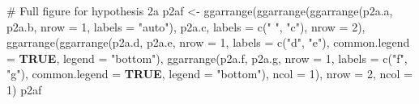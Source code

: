\documentclass[
  bookmarksnumbered]{article}
\newenvironment{Shaded}{\begin{snugshade}}{\end{snugshade}}
\newcommand{\AttributeTok}[1]{\textcolor[rgb]{0.80,0.80,0.80}{#1}}
\newcommand{\CommentTok}[1]{\textcolor[rgb]{0.50,0.62,0.50}{#1}}
\newcommand{\ConstantTok}[1]{\textcolor[rgb]{0.86,0.64,0.64}{\textbf{#1}}}
\newcommand{\DecValTok}[1]{\textcolor[rgb]{0.86,0.86,0.80}{#1}}
\newcommand{\FunctionTok}[1]{\textcolor[rgb]{0.94,0.94,0.56}{#1}}
\newcommand{\NormalTok}[1]{\textcolor[rgb]{0.80,0.80,0.80}{#1}}
\newcommand{\OtherTok}[1]{\textcolor[rgb]{0.94,0.94,0.56}{#1}}
\newcommand{\StringTok}[1]{\textcolor[rgb]{0.80,0.58,0.58}{#1}}
\begin{document}
\begin{Shaded}
\begin{Highlighting}[]
\CommentTok{\# Full figure for hypothesis 2a}
\NormalTok{p2af }\OtherTok{\textless{}{-}} \FunctionTok{ggarrange}\NormalTok{(}\FunctionTok{ggarrange}\NormalTok{(}\FunctionTok{ggarrange}\NormalTok{(p2a.a, p2a.b,}
                                      \AttributeTok{nrow =} \DecValTok{1}\NormalTok{,}
                                      \AttributeTok{labels =} \StringTok{"auto"}\NormalTok{), }
\NormalTok{                            p2a.c,}
                            \AttributeTok{labels =} \FunctionTok{c}\NormalTok{(}\StringTok{" "}\NormalTok{, }\StringTok{"c"}\NormalTok{),}
                            \AttributeTok{nrow =} \DecValTok{2}\NormalTok{), }
                  \FunctionTok{ggarrange}\NormalTok{(}\FunctionTok{ggarrange}\NormalTok{(p2a.d, p2a.e,}
                                      \AttributeTok{nrow =} \DecValTok{1}\NormalTok{,}
                                      \AttributeTok{labels =} \FunctionTok{c}\NormalTok{(}\StringTok{"d"}\NormalTok{, }\StringTok{"e"}\NormalTok{),}
                                      \AttributeTok{common.legend =} \ConstantTok{TRUE}\NormalTok{,}
                                      \AttributeTok{legend =} \StringTok{"bottom"}\NormalTok{),}
                            \FunctionTok{ggarrange}\NormalTok{(p2a.f, p2a.g,}
                                      \AttributeTok{nrow =} \DecValTok{1}\NormalTok{,}
                                      \AttributeTok{labels =} \FunctionTok{c}\NormalTok{(}\StringTok{"f"}\NormalTok{, }\StringTok{"g"}\NormalTok{),}
                                      \AttributeTok{common.legend =} \ConstantTok{TRUE}\NormalTok{,}
                                      \AttributeTok{legend =} \StringTok{"bottom"}\NormalTok{),}
                            \AttributeTok{ncol =} \DecValTok{1}\NormalTok{),}
                  \AttributeTok{nrow =} \DecValTok{2}\NormalTok{,}
                  \AttributeTok{ncol =} \DecValTok{1}\NormalTok{)}
\NormalTok{p2af}
\end{Highlighting}
\end{Shaded}
\end{document}
